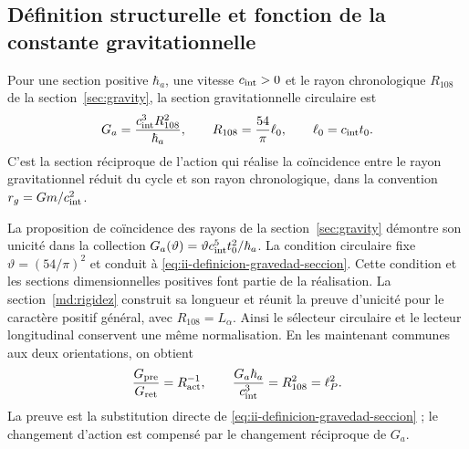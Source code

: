 \subsection{Définition structurelle et fonction de la constante gravitationnelle}
\label{sec:ii-definicion-gravedad}

\begin{definition}
Pour une section positive \(\hbar_a\), une vitesse
\(c_{\rm int}>0\) et le rayon chronologique \(R_{108}\) de la
section~\ref{sec:gravity}, la section gravitationnelle circulaire est
\begin{equation}
 G_a=\frac{c_{\rm int}^{3}R_{108}^{2}}{\hbar_a},
 \qquad R_{108}=\frac{54}{\pi}\ell_0,
 \qquad \ell_0=c_{\rm int}t_0.
 \label{eq:ii-definicion-gravedad-seccion}
\end{equation}
C'est la section réciproque de l'action qui réalise la coïncidence
entre le rayon gravitationnel réduit du cycle et son rayon
chronologique, dans la convention \(r_g=Gm/c_{\rm int}^2\).
\end{definition}

La proposition de coïncidence des rayons de la
section~\ref{sec:gravity} démontre son unicité dans la collection
\(G_a(\vartheta)=\vartheta c_{\rm int}^{5}t_0^2/\hbar_a\).
La condition circulaire fixe \(\vartheta=(54/\pi)^2\) et conduit
à \eqref{eq:ii-definicion-gravedad-seccion}. Cette condition et les
sections dimensionnelles positives font partie de la réalisation.
La section~\ref{md:rigidez} construit sa longueur et réunit la
preuve d’unicité pour le caractère positif général, avec
$R_{108}=L_\alpha$. Ainsi le sélecteur circulaire et le lecteur
longitudinal conservent une même normalisation.
En les maintenant communes aux deux orientations, on obtient
\begin{equation}
 \frac{G_{\mathrm{pre}}}{G_{\mathrm{ret}}}
 =R_{\mathrm{act}}^{-1},
 \qquad
 \frac{G_a\hbar_a}{c_{\rm int}^{3}}
 =R_{108}^{2}=\ell_P^2.
 \label{eq:ii-definicion-gravedad-area}
\end{equation}
La preuve est la substitution directe de
\eqref{eq:ii-definicion-gravedad-seccion} ; le changement d'action
est compensé par le changement réciproque de \(G_a\).
